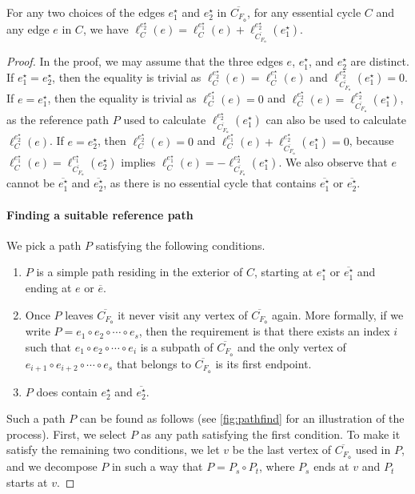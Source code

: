 \documentclass{theoretics}
\newcommand{\FO}{F_\mathsf{o}}
\newcommand{\eref}{e^\star}
\begin{document}
\begin{lemma}\label{lem:ref-edge}
For any two choices of the edges $\eref_1$ and $\eref_2$ in $\overline{C_{\FO}}$, for any essential cycle $C$ and any edge $e$ in $C$, we have $\ell_C^{\eref_2}(e)=\ell_C^{\eref_1}(e) + \ell_{\overline{C_{\FO}}}^{\eref_2}(\eref_1)$.
\end{lemma}
\begin{proof}
In the proof, we may assume that the three edges $e$, $\eref_1$, and $\eref_2$ are distinct.
If  $\eref_1 = \eref_2$, then the equality is trivial as $\ell_C^{\eref_2}(e)=\ell_C^{\eref_1}(e)$ and $\ell_{\overline{C_{\FO}}}^{\eref_2}(\eref_1) = 0$. If  $e = \eref_1$, then the equality is trivial as $\ell_C^{\eref_1}(e) = 0$ and $\ell_C^{\eref_2}(e)=  \ell_{\overline{C_{\FO}}}^{\eref_2}(\eref_1)$, as the reference path $P$ used to calculate $\ell_{\overline{C_{\FO}}}^{\eref_2}(\eref_1)$ can also be used to calculate $\ell_C^{\eref_2}(e)$.
If  $e = \eref_2$, then $\ell_C^{\eref_2}(e)=0$ and $\ell_C^{\eref_1}(e) + \ell_{\overline{C_{\FO}}}^{\eref_2}(\eref_1) = 0$, because $\ell_C^{\eref_1}(e)=\ell_{\overline{C_{\FO}}}^{\eref_1}(\eref_2)$ implies $\ell_C^{\eref_1}(e) = - \ell_{\overline{C_{\FO}}}^{\eref_2}(\eref_1)$.
We also observe that $e$ cannot be $\overline{\eref_1}$ and $\overline{\eref_2}$, as there is no essential cycle that contains  $\overline{\eref_1}$ or $\overline{\eref_2}$.

\paragraph{Finding a suitable reference path}
We pick a path $P$ satisfying the following conditions.
\begin{enumerate}
    \item $P$ is a simple path residing in the exterior of $C$, starting at $\eref_1$ or $\overline{\eref_1}$ and ending at $e$ or  $\overline{e}$.
    \item Once $P$ leaves $\overline{C_{\FO}}$ it never visit any vertex of $\overline{C_{\FO}}$ again. More formally, if we write $P = e_1 \circ e_2 \circ \cdots \circ e_s$, then the requirement is that there exists an index $i$ such that  $e_1 \circ e_2 \circ \cdots \circ e_i$ is a subpath of $\overline{C_{\FO}}$ and the only vertex of  $e_{i+1} \circ e_{i+2} \circ \cdots \circ e_s$ that belongs to $\overline{C_{\FO}}$ is its first endpoint.
    \item $P$ does contain $\eref_2$ and $\overline{\eref_2}$.
\end{enumerate}
Such a path $P$ can be found as follows (see \cref{fig:pathfind} for an illustration of the process). First, we select $P$ as any path satisfying the first condition. To make it satisfy the remaining two conditions, we let $v$ be the last vertex of $\overline{C_{\FO}}$ used in $P$, and we decompose $P$ in such a way that $P=P_s \circ P_t$, where $P_s$ ends at $v$ and $P_t$ starts at $v$. 


\end{proof}
\end{document}
